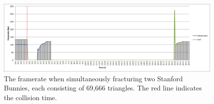 \begin{figure}
\centerline{\includegraphics[scale=0.7]{../Logs/double_bunny_framerate.png}}
\caption{The framerate when simultaneously fracturing two Stanford Bunnies, each consisting of 69,666 triangles. The red line indicates the collision time.}
\label{fig:4.29.1}
\end{figure}

